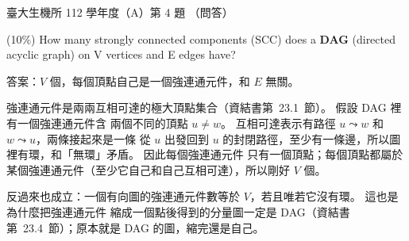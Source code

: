 \begin{pastexam}[label={px:ntu-112-bime-ds-04}]{臺大生機所 112 學年度（A）第 4 題}
（問答）

(10\%) How many strongly connected components (SCC) does a \textbf{DAG} (directed acyclic graph)
on V vertices and E edges have?
\end{pastexam}

\begin{pastsoln}
答案：$V$ 個，每個頂點自己是一個強連通元件，和 $E$ 無關。

強連通元件是兩兩互相可達的極大頂點集合（資結書第~23.1~節）。 假設 DAG 裡有一個強連通元件含
兩個不同的頂點 $u \ne w$。 互相可達表示有路徑 $u \leadsto w$ 和 $w \leadsto u$，兩條接起來是一條
從 $u$ 出發回到 $u$ 的封閉路徑，至少有一條邊，所以圖裡有環，和「無環」矛盾。 因此每個強連通元件
只有一個頂點；每個頂點都屬於某個強連通元件（至少它自己和自己互相可達），所以剛好 $V$ 個。

反過來也成立：一個有向圖的強連通元件數等於 $V$，若且唯若它沒有環。 這也是為什麼把強連通元件
縮成一個點後得到的分量圖一定是 DAG（資結書第~23.4~節）；原本就是 DAG 的圖，縮完還是自己。
\end{pastsoln}
